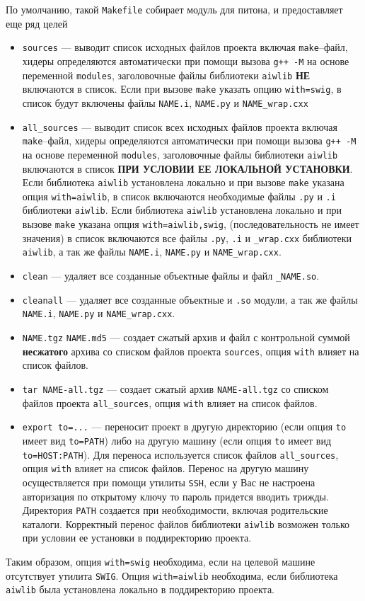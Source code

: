 По умолчанию, такой \verb'Makefile' собирает модуль для питона, и предоставляет еще ряд целей
\begin{itemize}
\item \verb'sources' --- выводит список исходных файлов проекта включая \verb'make'--файл, хидеры определяются автоматически 
при помощи вызова \verb'g++ -M' на основе переменной \verb'modules', заголовочные файлы библиотеки \verb'aiwlib' 
{\bf НЕ} включаются в список. Если при вызове \verb'make' указать опцию \verb'with=swig', в список будут включены файлы 
\verb'NAME.i', \verb'NAME.py' и \verb'NAME_wrap.cxx'
\item \verb'all_sources' --- выводит список всех исходных файлов проекта включая \verb'make'--файл, 
хидеры определяются автоматически 
при помощи вызова \verb'g++ -M' на основе переменной \verb'modules', заголовочные файлы библиотеки \verb'aiwlib' 
включаются в список {\bf ПРИ УСЛОВИИ ЕЕ ЛОКАЛЬНОЙ УСТАНОВКИ}. 
Если библиотека \verb'aiwlib' установлена локально и при вызове \verb'make' указана опция \verb'with=aiwlib', в список включаются  
необходимые файлы \verb'.py' и \verb'.i' библиотеки \verb'aiwlib'.
Если библиотека \verb'aiwlib' установлена локально и при вызове \verb'make' указана опция \verb'with=aiwlib,swig',
(последовательность не имеет значения) в список включаются
все файлы \verb'.py', \verb'.i' и \verb'_wrap.cxx' библиотеки \verb'aiwlib', а так же файлы 
\verb'NAME.i', \verb'NAME.py' и \verb'NAME_wrap.cxx'.
\item \verb'clean' --- удаляет все созданные объектные файлы и файл \verb'_NAME.so'.
\item \verb'cleanall' --- удаляет все созданные объектные и \verb'.so' модули, а так же файлы 
\verb'NAME.i', \verb'NAME.py' и \verb'NAME_wrap.cxx'.
\item \verb'NAME.tgz' \verb'NAME.md5' --- создает сжатый архив и файл с контрольной суммой {\bf несжатого} архива
со списком файлов  проекта \verb'sources', опция \verb'with' влияет на список файлов.
\item \verb'tar NAME-all.tgz' --- создает сжатый архив \verb'NAME-all.tgz'
со списком файлов  проекта \verb'all_sources', опция \verb'with' влияет на список файлов.
\item \verb'export to=...' --- переносит проект в другую директорию (если опция \verb'to' имеет вид \verb'to=PATH')
либо на другую машину (если опция \verb'to' имеет вид \verb'to=HOST:PATH'). Для переноса используется список 
файлов \verb'all_sources', опция \verb'with' влияет на список файлов. Перенос на другую машину осуществляется при помощи 
утилиты \verb'SSH', если у Вас не настроена авторизация по открытому ключу то пароль придется вводить трижды.
Директория \verb'PATH' создается при необходимости, включая родительские каталоги.
Корректный перенос файлов библиотеки \verb'aiwlib' возможен только при условии ее установки в поддиректорию проекта.
\end{itemize}
Таким образом, опция \verb'with=swig' необходима, если на целевой машине отсутствует утилита \verb'SWIG'. Опция \verb'with=aiwlib'
необходима, если библиотека \verb'aiwlib' была установлена локально в поддиректорию проекта.
